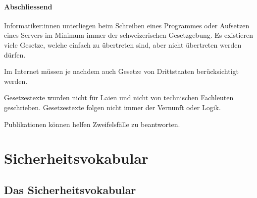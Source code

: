 \documentclass[a4paper,12pt]{article}
\begin{document}
\paragraph{Abschliessend} Informatiker:innen unterliegen beim Schreiben eines Programmes oder Aufsetzen eines Servers im Minimum immer der schweizerischen Gesetzgebung. Es existieren viele Gesetze, welche einfach zu übertreten sind, aber nicht übertreten werden dürfen.

Im Internet müssen je nachdem auch Gesetze von Drittstaaten berücksichtigt werden.

Gesetzestexte wurden nicht für Laien und nicht von technischen Fachleuten geschrieben. Gesetzestexte folgen nicht immer der Vernunft oder Logik.

Publikationen können helfen Zweifelsfälle zu beantworten.






\newpage
\section{Sicherheitsvokabular}

\subsection{Das Sicherheitsvokabular}
\end{document}
